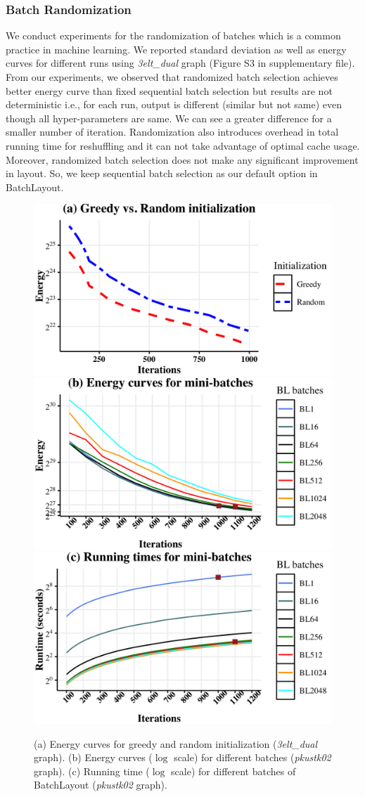 \documentclass{vgtc}
\newcommand{\toolname}{{BatchLayout}}
\begin{document}
\subsubsection{Batch Randomization}
We conduct experiments for the randomization of batches which is a common practice in machine learning. We reported standard deviation as well as energy curves for different runs using \emph{3elt\_dual} graph (Figure S3 in supplementary file). From our experiments, we observed that randomized batch selection achieves better energy curve than fixed sequential batch selection but results are not deterministic i.e., for each run, output is different (similar but not same) even though all hyper-parameters are same. We can see a greater difference for a smaller number of iteration. Randomization also introduces overhead in total running time for reshuffling and it can not take advantage of optimal cache usage. Moreover, randomized batch selection does not make any significant improvement in layout. So, we keep sequential batch selection as our default option in \toolname{}.
\begin{figure}[ht]
\includegraphics[width=0.33\linewidth]{figures/initialization.png}
\includegraphics[width=0.33\linewidth]{figures/batchesenergy3.png}
\includegraphics[width=0.33\linewidth]{figures/batchesruntime3.png}
\vspace{-0.4cm}
\caption{(a) Energy curves for greedy and random initialization (\emph{3elt\_dual} graph). (b) Energy curves ($\log$ scale) for different batches (\emph{pkustk02} graph). (c) Running time ($\log$ scale) for different batches of \toolname{} (\emph{pkustk02} graph).}
\label{fig:selfcheckout}
\end{figure}
\end{document}

